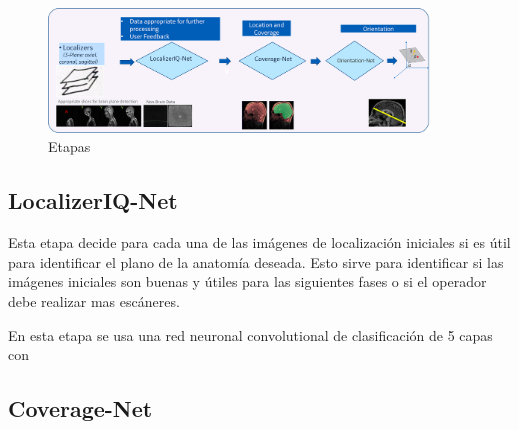      \begin{figure}[H]
        \centering
        \includegraphics[width=0.9\textwidth]{steps}
        \caption{Etapas}%
        \label{fig:steps}
     \end{figure}

    \subsection{LocalizerIQ-Net}
    
    Esta etapa decide para cada una de las imágenes de localización iniciales si es útil para
    identificar el plano de la anatomía deseada. Esto sirve para identificar si las imágenes iniciales
    son buenas y útiles para las siguientes fases o si el operador debe realizar mas escáneres.
    
    En esta etapa se usa una red neuronal convolutional de clasificación de 5 capas con 
    
    
    \subsection{Coverage-Net}
